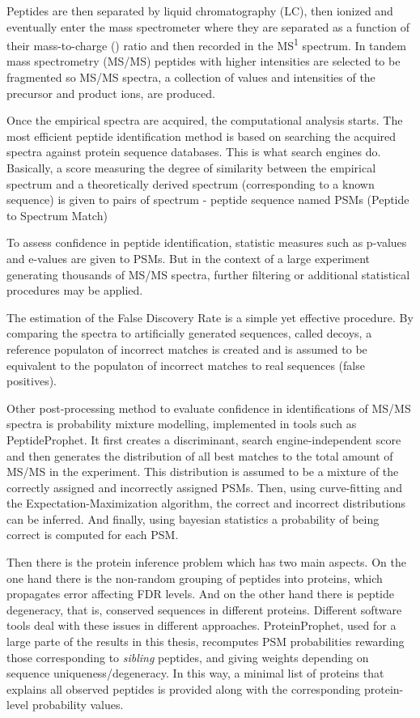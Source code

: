 Peptides are then separated by liquid chromatography (LC), then ionized
and eventually enter the mass spectrometer where they are separated
as a function of their mass-to-charge (\mz) ratio and then recorded in the MS\textsuperscript{1} spectrum.
In tandem mass spectrometry (MS/MS)
peptides with higher intensities are selected to be fragmented so 
MS/MS spectra, a collection of \mz values and intensities of the precursor and product ions, are produced.

Once the empirical spectra are acquired, the computational analysis starts.
The most efficient peptide identification method is based on searching 
the acquired spectra against protein sequence databases. This is what
search engines do. Basically, a score measuring the degree of similarity 
between the empirical spectrum and a theoretically derived spectrum (corresponding to a known 
sequence) is given to pairs of spectrum - peptide sequence named PSMs (Peptide to Spectrum Match)

To assess confidence in peptide identification, statistic measures such
as p-values and e-values are given to PSMs. But in the context of a large
experiment generating thousands of MS/MS spectra, further filtering or additional
statistical procedures may be applied.

The estimation of the False Discovery Rate is a simple yet effective procedure. By comparing the 
spectra to artificially generated sequences, called decoys, a reference populaton 
of incorrect matches is created and is assumed to be equivalent to the populaton
of incorrect matches to real sequences (false positives).

Other post-processing method to evaluate confidence in identifications of MS/MS spectra 
is probability mixture modelling, implemented in tools such as PeptideProphet. It 
first creates a discriminant, search engine-independent score and then generates
the distribution of all best matches to the total amount of MS/MS in the experiment.
This distribution is assumed to be a mixture of the correctly assigned and incorrectly assigned
PSMs. Then, using curve-fitting and the Expectation-Maximization algorithm, the correct
and incorrect distributions can be inferred. And finally, using bayesian statistics
a probability of being correct is computed for each PSM.

Then there is the protein inference problem which has two main aspects.
On the one hand there is the non-random grouping of peptides into proteins, 
which propagates error affecting FDR levels. And on the other hand there is 
peptide degeneracy, that is, conserved sequences in different proteins.
Different software tools deal with these issues in different approaches. 
ProteinProphet, used for a large parte of the results in this thesis, recomputes
PSM probabilities rewarding those corresponding to \emph{sibling} peptides, 
and giving weights depending on sequence uniqueness/degeneracy. 
In this way, a minimal list of proteins that explains all observed peptides
is provided along with the corresponding protein-level probability values.

